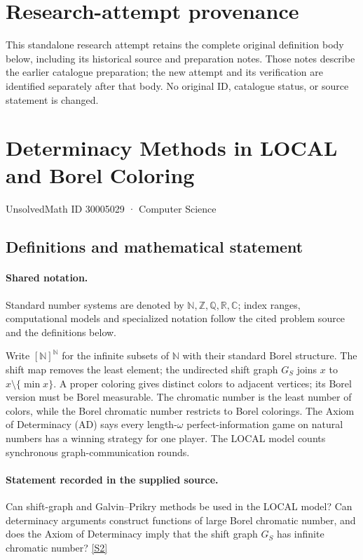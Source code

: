 \documentclass[11pt]{article}
\begin{document}
\section*{Research-attempt provenance}
This standalone research attempt retains the complete original definition body below,
including its historical source and preparation notes. Those notes describe the
earlier catalogue preparation; the new attempt and its verification are identified
separately after that body. No original ID, catalogue status, or source statement is changed.

\section{Determinacy Methods in LOCAL and Borel Coloring}\label{30005029}
{\small UnsolvedMath ID 30005029 · Computer Science}
\subsection{Definitions and mathematical statement}

\paragraph{Shared notation.}Standard number systems are denoted by $\mathbb N,\mathbb Z,\mathbb Q,\mathbb R,\mathbb C$; index ranges, computational models and specialized notation follow the cited problem source and the definitions below.


Write $[\mathbb N]^{\mathbb N}$ for the infinite subsets of $\mathbb N$ with their standard Borel structure. The shift map removes the least element; the undirected shift graph $G_S$ joins $x$ to $x\setminus\{\min x\}$. A proper coloring gives distinct colors to adjacent vertices; its Borel version must be Borel measurable. The chromatic number is the least number of colors, while the Borel chromatic number restricts to Borel colorings. The Axiom of Determinacy (AD) says every length-$\omega$ perfect-information game on natural numbers has a winning strategy for one player. The LOCAL model counts synchronous graph-communication rounds.
\paragraph{Statement recorded in the supplied source.}
Can shift-graph and Galvin–Prikry methods be used in the LOCAL model? Can determinacy arguments construct functions of large Borel chromatic number, and does the Axiom of Determinacy imply that the shift graph $G_S$ has infinite chromatic number? \href{https://doi.org/10.4171/owr/2022/8}{[S2]}
\end{document}
